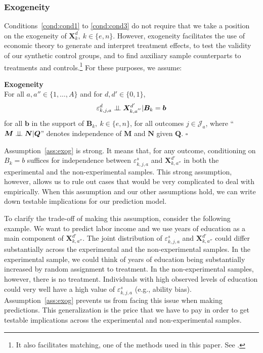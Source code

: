 \subsubsection{Exogeneity}

Conditions~\ref{cond:cond1} to \ref{cond:cond3} do not require that we take a position on the exogeneity of $\bm{X}^d_k, \: k \in \{e,n\}$. However, exogeneity facilitates the use of economic theory to generate and interpret treatment effects, to test the validity of our synthetic control groups, and to find auxiliary sample counterparts to treatments and controls.\footnote{It also facilitates matching, one of the methods used in this paper. See \cite{Heckman_Navarro_2004_REStat}.} For these purposes, we assume:

\onehalfspacing
\begin{assumption}\label{ass:exog} \textbf{Exogeneity}\\
For all $a, a'' \in \{ 1, \ldots, A \}$ and for $d, d' \in \{0,1\}$,
\begin{equation}
\varepsilon^d_{k,j,a} \perp\!\!\!\perp \bm{X}^{d^{\prime}}_{k,a^{''}} | \bm{B}_k = \bm{b}
\end{equation}
for all $\bm{b}$ in the support of $\bm{B}_k, \: k \in \{e,n\}$, for all outcomes $j \in \mathcal{J}_{a}$, where ``$\bm{M} \perp\!\!\!\perp \bm{N}|\bm{Q}$'' denotes independence of $\bm{M}$ and $\bm{N}$ given $\bm{Q}$. $\square$
\end{assumption}
\doublespacing

Assumption~\ref{ass:exog} is strong. It means that, for any outcome, conditioning on $B_{k} = b$ suffices for independence between $\varepsilon_{k,j,a}^s$ and $\bm{X}_{k,{a''}}^{d'}$ in both the experimental and the non-experimental samples. This strong assumption, however, allows us to rule out cases that would be very complicated to deal with empirically. When this assumption and our other assumptions hold, we can write down testable implications for our prediction model. 

To clarify the trade-off of making this assumption, consider the following example. We want to predict labor income and we use years of education as a main component of $\bm{X}_{k,{a''}}^{d'}$. The joint distribution of $\varepsilon_{k,j,a}^s$ and $\bm{X}_{k,{a''}}^{d'}$ could differ substantially across the experimental and the non-experimental samples. In the experimental sample, we could think of years of education being substantially increased by random assignment to treatment. In the non-experimental samples, however, there is no treatment. Individuals with high observed levels of education could very well have a high value of  $\varepsilon_{k,j,a}^s$ (e.g., ability bias). Assumption~\ref{ass:exog} prevents us from facing this issue when making predictions. This generalization is the price that we have to pay in order to get testable implications across the experimental and non-experimental samples.

